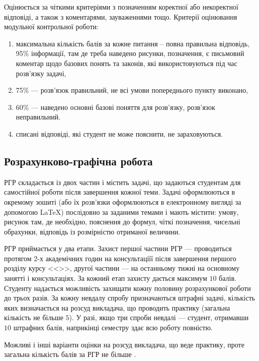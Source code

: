 \documentclass{Syllabus}
\begin{document}
Оцінюється за чіткими критеріями з позначенням коректної або некоректної відповіді, а також з коментарями, зауваженнями тощо. Критерії оцінювання модульної контрольної роботи:
\begin{enumerate}[label=$\bullet$]
	\item максимальна кількість балів за кожне питання – повна правильна відповідь, 95\% інформації, там де треба наведено рисунки, позначення, є письмовий коментар щодо базових понять та законів, які використовуються під час розв’язку задачі,
	\item 75\%  --- розв’язок правильний, не всі умови попереднього пункту виконано,
	\item 60\%  --- наведено основні базові поняття для розв’язку, розв’язок неправильний.
	\item списані відповіді, які студент не може пояснити, не зараховуються.
\end{enumerate}


\subsection*{Розрахунково-графічна робота}


РГР складається із двох частин і містить задачі, що задаються студентам для самостійної роботи після завершення кожної теми. Задачі оформлюються в окремому зошиті (або їх розв'язки оформлюються в електронному вигляді за допомогою \LaTeX{}) послідовно за заданими темами і мають містити: умову, рисунок там, де необхідно, пояснення до формул, чіткі позначення, чисельні обрахунки, відповідь із розмірністю отриманої величини.

РГР приймається у два етапи. Захист першої частини РГР --- проводиться протягом 2-х академічних годин на консультаціїї після завершення першого розділу курсу <<\discipline>>, другої частини --- на останньому тижні на основному занятті і консультаціях. За кожний етап захисту дається максимум $10$ балів. Студенту надається можливість захищати кожну половину розрахункової роботи до трьох разів. За кожну невдалу спробу призначаються штрафні задачі, кількість яких визначається на розсуд викладача, що проводить практику (загальна кількість не більше $5$). У разі, якщо три спроби невдалі --- студент, отримавши $10$ штрафних балів, наприкінці семестру здає всю роботу повністю.


Можливі і інші варіанти оцінки на розсуд викладача, що веде практику, проте загальна кількість балів за РГР не більше \rgrBal.
\end{document}
